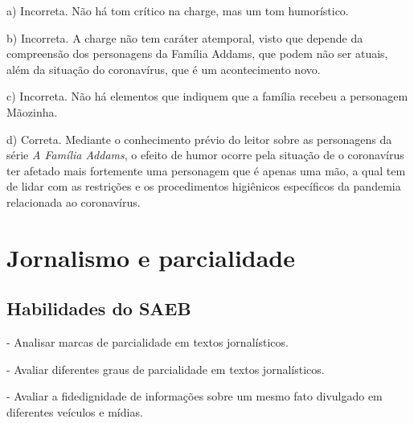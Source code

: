 \begin{itemize}
\begin{itemize}
{\begin{itemize}
\begin{itemize}
a) Incorreta. Não há tom crítico na charge, mas um tom humorístico.

b) Incorreta. A charge não tem caráter atemporal, visto que depende da
compreensão dos personagens da Família Addams, que podem não ser atuais,
além da situação do coronavírus, que é um acontecimento novo.

c) Incorreta. Não há elementos que indiquem que a família recebeu a
personagem Mãozinha.

d) Correta. Mediante o conhecimento prévio do leitor sobre as
personagens da série \emph{A Família Addams}, o efeito de humor ocorre
pela situação de o coronavírus ter afetado mais fortemente uma
personagem que é apenas uma mão, a qual tem de lidar com as restrições e
os procedimentos higiênicos específicos da pandemia relacionada ao
coronavírus.

\chapter{Jornalismo e parcialidade}

\section{Habilidades do SAEB}

- Analisar marcas de parcialidade em textos jornalísticos.

- Avaliar diferentes graus de parcialidade em textos jornalísticos.

- Avaliar a fidedignidade de informações sobre um mesmo fato divulgado
em diferentes veículos e mídias.

\end{itemize}
\end{itemize}}
\end{itemize}
\end{itemize}
